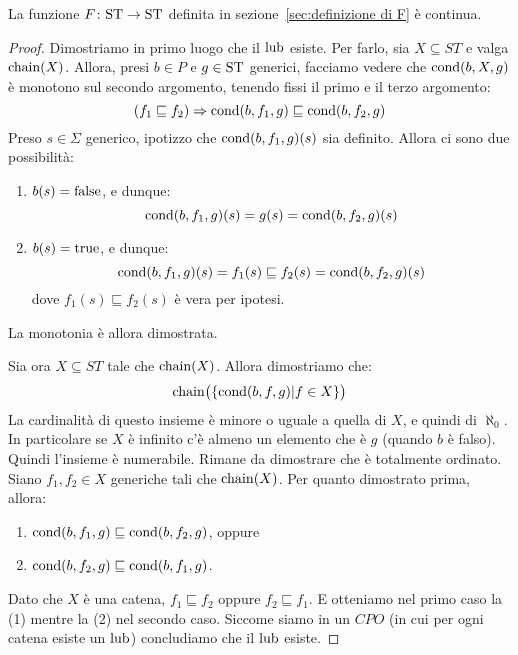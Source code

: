 \begin{teorema}
La funzione $\mathord{F}\colon\mathrm{ST}\to\mathrm{ST}$ definita in sezione~\textup{\ref{sec:definizione di F}} è continua.
\end{teorema}

\begin{proof}
Dimostriamo in primo luogo che il $\mathop{\mathrm{lub}}\nolimits$ esiste.
Per farlo, sia $ X \subseteq ST$ e valga $\mathop{\mathrm{chain}}\nolimits(X)$.
Allora, presi $b \in P$ e $g \in \mathrm{ST}$ generici,
facciamo vedere che $ \mathrm{cond}(b,X,g) $ è monotono sul
secondo argomento, tenendo fissi il primo e il terzo argomento:
\[
  (f_1 \sqsubseteq f_2) \Rightarrow \mathrm{cond}(b,f_{1},g) \sqsubseteq \mathrm{cond}(b,f_{2},g)
\]
Preso $s \in \Sigma $ generico, ipotizzo che $\mathrm{cond}(b,f_1,g)(s)$
sia definito. Allora ci sono due possibilità:
\begin{enumerate}
  \item $b(s) = \mathrm{false}$, e dunque:
        \[ \mathrm{cond}(b,f_1,g)(s)=g(s)=\mathrm{cond}(b,f_2,g)(s) \]
  \item $ b(s) = \mathrm{true} $, e dunque:
        \[
          \mathrm{cond}(b,f_1,g)(s) = f_{1}(s)
          \sqsubseteq f_{2}(s) = \mathrm{cond}(b,f_2,g)(s)
        \]
        dove $f_{1}(s) \sqsubseteq f_{2}(s)$ è vera per ipotesi.
\end{enumerate}
La monotonia è allora dimostrata.

Sia ora $ X \subseteq ST$ tale che $\mathop{\mathrm{chain}}\nolimits(X) $. Allora dimostriamo che:
\[
  \mathop{\mathrm{chain}}\nolimits\bigl( \{\mathrm{cond}(b,f,g) | f \in X\}\bigr)
\]
La cardinalità di questo insieme è minore o uguale
a quella di $X$, e quindi di $\aleph_0$.
In particolare se $X$ è infinito c'è almeno un elemento
che è $g$ (quando $b$ è falso). Quindi l'insieme è numerabile.
Rimane da dimostrare che è totalmente ordinato.
Siano $f_1,f_2 \in X$ generiche tali che $\mathop{\mathrm{chain}}\nolimits(X)$.
Per quanto dimostrato prima, allora:
\begin{enumerate}
  \item $\mathrm{cond}(b,f_1,g) \sqsubseteq \mathrm{cond}(b,f_2,g)$, oppure
  \item $\mathrm{cond}(b,f_2,g) \sqsubseteq \mathrm{cond}(b,f_1,g)$.
\end{enumerate}
Dato che $X$ è una catena, $f_1 \sqsubseteq f_2$ oppure
$f_2 \sqsubseteq f_1 $. E otteniamo nel primo caso la (1)
mentre la (2) nel secondo caso.
Siccome siamo in un $CPO$ (in cui per ogni catena esiste
un $\mathop{\mathrm{lub}}\nolimits$) concludiamo che il $\mathop{\mathrm{lub}}\nolimits$ esiste.


\end{proof}
